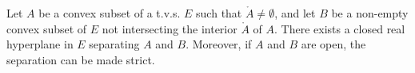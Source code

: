 Let $A$ be a convex subset of a t.v.s. $E$ such that $\mathring{A} \neq \emptyset$, and let $B$ be a non-empty convex subset of $E$ not intersecting the interior $\mathring{A}$ of $A$. There exists a closed real hyperplane in $E$ separating $A$ and $B$. Moreover, if $A$ and $B$ are open, the separation can be made strict.
